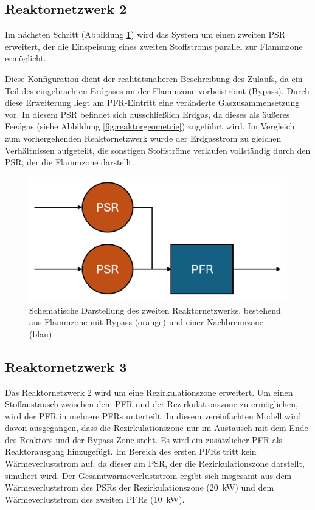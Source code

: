         \subsection*{Reaktornetzwerk 2}
            Im nächsten Schritt (Abbildung \ref{fig:reaktornetzwerk2}) wird das System um einen zweiten PSR erweitert, der die Einspeisung eines zweiten Stoffstroms parallel zur Flammzone ermöglicht. 

            Diese Konfiguration dient der realitätsnäheren Beschreibung des Zulaufs, da ein Teil des eingebrachten Erdgases an der Flammzone vorbeiströmt (Bypass). Durch diese Erweiterung liegt am PFR-Eintritt eine veränderte Gaszusammensetzung vor. In diesem PSR befindet sich ausschließlich Erdgas, da dieses als äußeres Feedgas (siehe Abbildung \ref{fig:reaktorgeometrie}) zugeführt wird. Im Vergleich zum vorhergehenden Reaktornetzwerk wurde der Erdgasstrom zu gleichen Verhältnissen aufgeteilt, die sonstigen Stoffströme verlaufen vollständig durch den PSR, der die Flammzone darstellt.  
            \begin{figure}[H]
                \centering
                \includegraphics[width=0.7\linewidth]{img/Erweiterungen/2.png}
                \caption{Schematische Darstellung des zweiten Reaktornetzwerks, bestehend aus Flammzone mit Bypass (orange) und einer Nachbrennzone (blau)}
                \label{fig:reaktornetzwerk2}
            \end{figure}
        \subsection*{Reaktornetzwerk 3}
            Das Reaktornetzwerk 2 wird um eine Rezirkulationszone erweitert. Um einen Stoffaustausch zwischen dem PFR und der Rezirkulationszone zu ermöglichen, wird der PFR in mehrere PFRs unterteilt. In diesem vereinfachten Modell wird davon ausgegangen, dass die Rezirkulationszone nur im Austausch mit dem Ende des Reaktors und der Bypass Zone steht. Es wird ein zusätzlicher PFR als Reaktorausgang hinzugefügt. Im Bereich des ersten PFRs tritt kein Wärmeverluststrom auf, da dieser am PSR, der die Rezirkulationszone darstellt, simuliert wird. Der Gesamtwärmeverluststrom ergibt sich insgesamt aus dem Wärmeverluststrom des PSRs der Rezirkulationszone (20~kW) und dem Wärmeverluststrom des zweiten PFRs (10~kW). 

